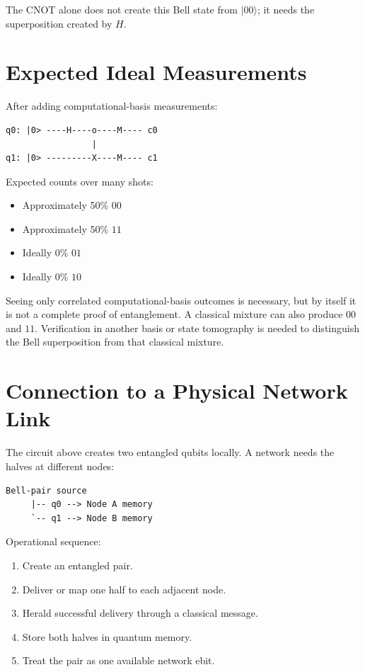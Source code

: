 \documentclass[11pt]{article}
\begin{document}
The CNOT alone does not create this Bell state from \( |00\rangle \); it needs the superposition created by \(H\).

\section{Expected Ideal Measurements}

After adding computational-basis measurements:

\begin{verbatim}
q0: |0> ----H----o----M---- c0
                 |
q1: |0> ---------X----M---- c1
\end{verbatim}

Expected counts over many shots:

\begin{itemize}
    \item Approximately 50\% \(00\)
    \item Approximately 50\% \(11\)
    \item Ideally 0\% \(01\)
    \item Ideally 0\% \(10\)
\end{itemize}

Seeing only correlated computational-basis outcomes is necessary, but by itself it is not a complete proof of entanglement. A classical mixture can also produce \(00\) and \(11\). Verification in another basis or state tomography is needed to distinguish the Bell superposition from that classical mixture.

\section{Connection to a Physical Network Link}

The circuit above creates two entangled qubits locally. A network needs the halves at different nodes:

\begin{verbatim}
Bell-pair source
     |-- q0 --> Node A memory
     `-- q1 --> Node B memory
\end{verbatim}

Operational sequence:

\begin{enumerate}
    \item Create an entangled pair.
    \item Deliver or map one half to each adjacent node.
    \item Herald successful delivery through a classical message.
    \item Store both halves in quantum memory.
    \item Treat the pair as one available network ebit.
\end{enumerate}
\end{document}
